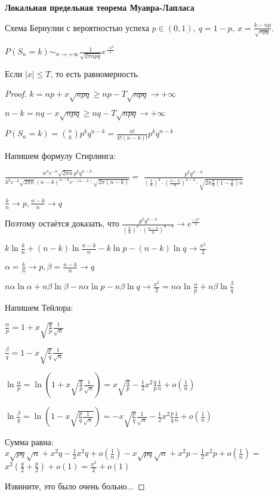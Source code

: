 \begin{theorem}
    \textbf{Локальная предельная теорема Муавра-Лапласа}

    Схема Бернулии с вероятностью успеха $p \in (0, 1), \ q = 1 - p, \ x = \frac{k - np}{\sqrt{npq}}$.

    $P(S_n = k) \sim_{n \to +\infty} \frac{1}{\sqrt{2\pi n p q}} e^{\frac{-x^2}{2}}$

    Если $|x| \leqslant T$, то есть равномерность.
\end{theorem}

\begin{proof}
    $k = np + x\sqrt{npq} \geqslant np - T\sqrt{npq} \rightarrow +\infty$

    $n - k = nq - x\sqrt{npq} \geqslant nq - T\sqrt{npq} \rightarrow +\infty$

    $P(S_n = k) = \binom{n}{k} p^k q^{n - k} = \frac{n!}{k!(n - k)!}p^k q^{n - k}$
    
    Напишем формулу Стирлинга:

    $\frac{n^n e^{-n} \sqrt{2\pi n}p^kq^{n-k}}{k^ke^{-k}\sqrt{2\pi n} (n-k)^{n - k} e^{-(n - k)} \sqrt{2 \pi (n - k)}} =$
    $\frac{p^k q^{n - k}}{(\frac{k}{n})^k \cdot (\frac{n - k}{n})^{n - k} \cdot \sqrt{2 \pi \frac{k}{n} (1 - \frac{k}{n})n}}$

    $\frac{k}{n} \rightarrow p, \frac{n - k}{n} \rightarrow q$

    Поэтому остаётся доказать, что $\frac{p^k q^{n - k}}{(\frac{k}{n})^k \cdot (\frac{n - k}{n})^{n - k}} \rightarrow e^{\frac{-x^2}{2}}$

    $k \ln \frac{k}{n} + (n - k) \ln \frac{n - k}{n} - k \ln p - (n - k)\ln q \rightarrow \frac{x^2}{2}$

    $\alpha = \frac{k}{n} \rightarrow p, \beta = \frac{n - k}{n} \rightarrow q$

    $n \alpha \ln \alpha + n \beta \ln \beta - n\alpha \ln p - n\beta \ln q \rightarrow \frac{x^2}{2} = n\alpha \ln \frac{\alpha}{p} + n \beta \ln \frac{\beta}{q}$

    Напишем Тейлора:

    $\frac{\alpha}{p} = 1 + x\sqrt{\frac{q}{p}} \frac{1}{\sqrt{n}}$

    $\frac{\beta}{q} = 1 - x \sqrt{\frac{p}{q}} \frac{1}{\sqrt{n}}$

    $\ln \frac{\alpha}{p} = \ln (1 + x\sqrt{\frac{q}{p}} \frac{1}{\sqrt{n}}) = x \sqrt{\frac{q}{p}} - \frac{1}{2}x^2\frac{q}{p} \frac{1}{n} + o(\frac{1}{n}) $ 

    $\ln \frac{\beta}{q} = \ln (1 - x \sqrt{\frac{p}{q} \frac{1}{\sqrt{n}}}) = -x \sqrt{\frac{p}{q}} \frac{1}{\sqrt{n}} - \frac{1}{2}x^2 \frac{p}{q} \frac{1}{n} + o(\frac{1}{n})$

    Сумма равна: $x\sqrt{pq}\sqrt{n} + x^2q - \frac{1}{2}x^2q + o(\frac{1}{n}) - x\sqrt{pq}\sqrt{n} + x^2p - \frac{1}{2}x^2p + o(\frac{1}{n}) = $
    $x^2 (\frac{q}{2} + \frac{p}{2}) + o(1) = \frac{x^2}{2} + o(1)$

    Извините, это было очень больно...
\end{proof}

